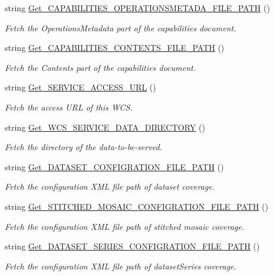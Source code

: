\begin{DoxyCompactItemize}
string \hyperlink{classWCS__Configure_ae565e9adcf4513f0de954e422017cadf}{Get\_\-CAPABILITIES\_\-OPERATIONSMETADA\_\-FILE\_\-PATH} ()
\begin{DoxyCompactList}\small\item\em Fetch the OperationsMetadata part of the capabilities document. \end{DoxyCompactList}\item 
string \hyperlink{classWCS__Configure_aeec65d726fddb454ec9c943ef46602ca}{Get\_\-CAPABILITIES\_\-CONTENTS\_\-FILE\_\-PATH} ()
\begin{DoxyCompactList}\small\item\em Fetch the Contents part of the capabilities document. \end{DoxyCompactList}\item 
string \hyperlink{classWCS__Configure_afdecaaadfc30c79f6766b606fd05b402}{Get\_\-SERVICE\_\-ACCESS\_\-URL} ()
\begin{DoxyCompactList}\small\item\em Fetch the access URL of this WCS. \end{DoxyCompactList}\item 
string \hyperlink{classWCS__Configure_abd5989379bf561c53c7c14d37a8f99e9}{Get\_\-WCS\_\-SERVICE\_\-DATA\_\-DIRECTORY} ()
\begin{DoxyCompactList}\small\item\em Fetch the directory of the data-\/to-\/be-\/served. \end{DoxyCompactList}\item 
string \hyperlink{classWCS__Configure_a82ce7ca820eed3e38a66a1befb885e4b}{Get\_\-DATASET\_\-CONFIGRATION\_\-FILE\_\-PATH} ()
\begin{DoxyCompactList}\small\item\em Fetch the configuration XML file path of dataset coverage. \end{DoxyCompactList}\item 
string \hyperlink{classWCS__Configure_ae0fc8963b3530a687c0b6fca39e28519}{Get\_\-STITCHED\_\-MOSAIC\_\-CONFIGRATION\_\-FILE\_\-PATH} ()
\begin{DoxyCompactList}\small\item\em Fetch the configuration XML file path of stitched mosaic coverage. \end{DoxyCompactList}\item 
string \hyperlink{classWCS__Configure_a6aeb058758db3aab635af53dbcf5e7b2}{Get\_\-DATASET\_\-SERIES\_\-CONFIGRATION\_\-FILE\_\-PATH} ()
\begin{DoxyCompactList}\small\item\em Fetch the configuration XML file path of datasetSeries coverage. \end{DoxyCompactList}\item 

\end{DoxyCompactItemize}
